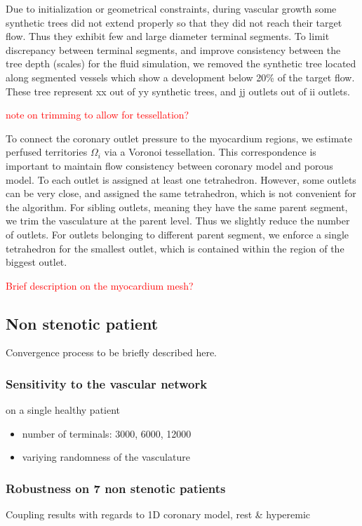 \documentclass[journal]{IEEEtran}
\newcommand{\clcg}[1]{\textcolor{red}{#1}}
\begin{document}
Due to initialization or geometrical constraints, during vascular growth some synthetic trees did not extend properly so that they did not reach their target flow. Thus they exhibit few and large diameter terminal segments. To limit discrepancy between terminal segments, and improve consistency between the tree depth (scales) for the fluid simulation, we removed the synthetic tree located along segmented vessels which show a development below 20\% of the target flow. These tree represent xx out of yy synthetic trees, and jj outlets out of ii outlets.

\clcg{note on trimming to allow for tessellation?}

To connect the coronary outlet pressure to the myocardium regions, we estimate perfused territories $\Omega_i$ via a Voronoi tessellation. This correspondence is important to maintain flow consistency between coronary model and porous model. To each outlet is assigned at least one tetrahedron. However, some outlets can be very close, and assigned the same tetrahedron, which is not convenient for the algorithm. For sibling outlets, meaning they have the same parent segment, we trim the vasculature at the parent level. Thus we slightly reduce the number of outlets. For outlets belonging to different parent segment, we enforce a single tetrahedron for the smallest outlet, which is contained within the region of the biggest outlet.


\clcg{Brief description on the myocardium mesh?}

\subsection{Non stenotic patient}
Convergence process to be briefly described here.
\subsubsection{Sensitivity to the vascular network}
on a single healthy patient
\begin{itemize}
\item number of terminals: 3000, 6000, 12000
\item variying randomness of the vasculature
\end{itemize}

\subsubsection{Robustness on 7 non stenotic patients}\label{subsubsec7healthy}
Coupling results with regards to 1D coronary model, rest \& hyperemic
\end{document}

